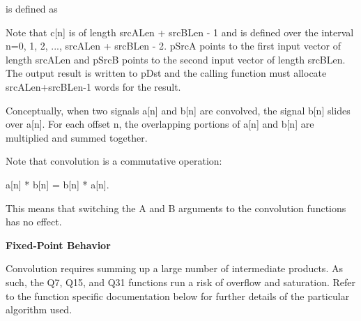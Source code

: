 \begin{DoxyParagraph}{}
is defined as  
\end{DoxyParagraph}
\begin{DoxyParagraph}{}
Note that {\ttfamily c\mbox{[}n\mbox{]}} is of length {\ttfamily src\-A\-Len + src\-B\-Len -\/ 1} and is defined over the interval {\ttfamily n=0, 1, 2, ..., src\-A\-Len + src\-B\-Len -\/ 2}. {\ttfamily p\-Src\-A} points to the first input vector of length {\ttfamily src\-A\-Len} and {\ttfamily p\-Src\-B} points to the second input vector of length {\ttfamily src\-B\-Len}. The output result is written to {\ttfamily p\-Dst} and the calling function must allocate {\ttfamily src\-A\-Len+src\-B\-Len-\/1} words for the result.
\end{DoxyParagraph}
\begin{DoxyParagraph}{}
Conceptually, when two signals {\ttfamily a\mbox{[}n\mbox{]}} and {\ttfamily b\mbox{[}n\mbox{]}} are convolved, the signal {\ttfamily b\mbox{[}n\mbox{]}} slides over {\ttfamily a\mbox{[}n\mbox{]}}. For each offset {\ttfamily n}, the overlapping portions of a\mbox{[}n\mbox{]} and b\mbox{[}n\mbox{]} are multiplied and summed together.
\end{DoxyParagraph}
\begin{DoxyParagraph}{}
Note that convolution is a commutative operation\-:
\end{DoxyParagraph}

\begin{DoxyPre}   
                  a[n] * b[n] = b[n] * a[n].   
\end{DoxyPre}


\begin{DoxyParagraph}{}
This means that switching the A and B arguments to the convolution functions has no effect.
\end{DoxyParagraph}
{\bfseries Fixed-\/\-Point Behavior}

\begin{DoxyParagraph}{}
Convolution requires summing up a large number of intermediate products. As such, the Q7, Q15, and Q31 functions run a risk of overflow and saturation. Refer to the function specific documentation below for further details of the particular algorithm used. 
\end{DoxyParagraph}


